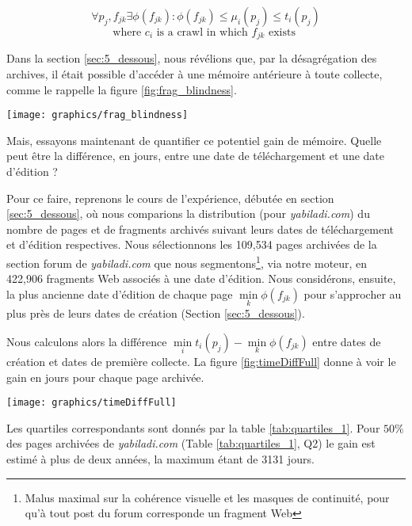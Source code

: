 \documentclass[symmetric,justified,marginals=raggedouter]{tufte-book}
\begin{document}
\[
	\forall p_j,f_{jk} \exists \phi(f_{jk}) : \phi(f_{jk}) \leq \mu_i(p_j) \leq t_i(p_j)
\] 
\[
	\textrm{where } c_i \textrm{ is a crawl in which } f_{jk} \textrm{ exists   }
\]

\noindent Dans la section \ref{sec:5_dessous}, nous révélions que, par la désagrégation des archives, il était possible d'accéder à une mémoire antérieure à toute collecte, comme le rappelle la figure \ref{fig:frag_blindness}. 

\begin{figure*}%
  \texttt{[image: graphics/frag\_blindness]}
  \caption{La fragmentation de la page $p_1$ permet d'accéder à des éléments antérieurs à la date de collecte $t_1(p_1)$}
  \label{fig:frag_blindness}
\end{figure*}

\noindent Mais, essayons maintenant de quantifier ce potentiel gain de mémoire. Quelle peut être la différence, en jours, entre une date de téléchargement et une date d'édition ? 

Pour ce faire, reprenons le cours de l'expérience,  débutée en section \ref{sec:5_dessous}, où nous comparions la distribution (pour \textit{yabiladi.com}) du nombre de pages et de fragments archivés suivant leurs dates de téléchargement et d'édition respectives. Nous sélectionnons les 109,534 pages archivées de la section forum de \textit{yabiladi.com} que nous segmentons\footnote{Malus maximal sur la cohérence visuelle et les masques de continuité, pour qu'à tout post du forum corresponde un fragment Web}, via notre moteur, en 422,906 fragments Web associés à une date d'édition. Nous considérons, ensuite, la plus ancienne date d'édition de chaque page $\min\limits_{k} \phi(f_{jk})$ pour s'approcher au plus près de leurs dates de création (Section \ref{sec:5_dessous}). 

Nous calculons alors la différence $\min\limits_{i} t_i(p_j) - \min\limits_{k} \phi(f_{jk})$  entre dates de création et dates de première collecte. La figure \ref{fig:timeDiffFull} donne à voir le gain en jours pour chaque page archivée. 
\newpage

\begin{figure*}%
  \texttt{[image: graphics/timeDiffFull]}
  \caption{La fragmentation de la page $p_1$ permet d'accéder à des éléments antérieurs à la date de collecte $t_1(p_1)$}
  \label{fig:timeDiffFull}
\end{figure*}

\noindent Les quartiles correspondants sont donnés par la table \ref{tab:quartiles_1}. Pour $50\%$ des pages archivées de \textit{yabiladi.com} (Table \ref{tab:quartiles_1}, Q2) le gain est estimé à plus de deux années, la maximum étant de 3131 jours.
\end{document}
